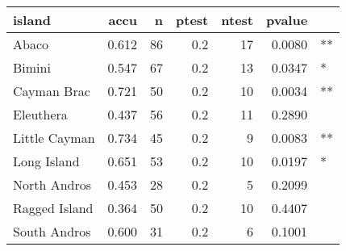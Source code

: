 
\begin{tabular}{l|r|r|r|r|r|l}
\hline
island & accu & n & ptest & ntest & pvalue & \\
\hline
Abaco & 0.612 & 86 & 0.2 & 17 & 0.0080 & **\\
\hline
Bimini & 0.547 & 67 & 0.2 & 13 & 0.0347 & *\\
\hline
Cayman Brac & 0.721 & 50 & 0.2 & 10 & 0.0034 & **\\
\hline
Eleuthera & 0.437 & 56 & 0.2 & 11 & 0.2890 & \\
\hline
Little Cayman & 0.734 & 45 & 0.2 & 9 & 0.0083 & **\\
\hline
Long Island & 0.651 & 53 & 0.2 & 10 & 0.0197 & *\\
\hline
North Andros & 0.453 & 28 & 0.2 & 5 & 0.2099 & \\
\hline
Ragged Island & 0.364 & 50 & 0.2 & 10 & 0.4407 & \\
\hline
South Andros & 0.600 & 31 & 0.2 & 6 & 0.1001 & \\
\hline
\end{tabular}
